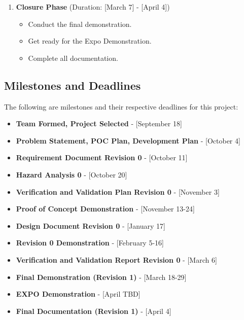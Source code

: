 \documentclass{article}
\begin{document}
\begin{enumerate}
  \item \textbf{Closure Phase} (Duration: [March 7] - [April 4])
  \begin{itemize}
    \item Conduct the final demonstration.
    \item Get ready for the Expo Demonstration.
    \item Complete all documentation.
  \end{itemize}
\end{enumerate}


\subsection{Milestones and Deadlines}

The following are milestones and their respective deadlines for this project:

\begin{itemize}
  \item \textbf{Team Formed, Project Selected} - [September 18]
  \item \textbf{Problem Statement, POC Plan, Development Plan} - [October 4]
  \item \textbf{Requirement Document  Revision 0} - [October 11]
  \item \textbf{Hazard Analysis 0} - [October 20]
  \item \textbf{Verification and Validation Plan Revision 0} - [November 3]
  \item \textbf{Proof of Concept Demonstration} - [November 13-24]
  \item \textbf{Design Document Revision 0} - [January 17]
  \item \textbf{Revision 0 Demonstration} - [February 5-16]
  \item \textbf{Verification and Validation Report Revision 0} - [March 6]
  \item \textbf{Final Demonstration (Revision 1)} - [March 18-29]
  \item \textbf{EXPO Demonstration} - [April TBD]
  \item \textbf{Final Documentation (Revision 1)} - [April 4]
\end{itemize}
\end{document}
